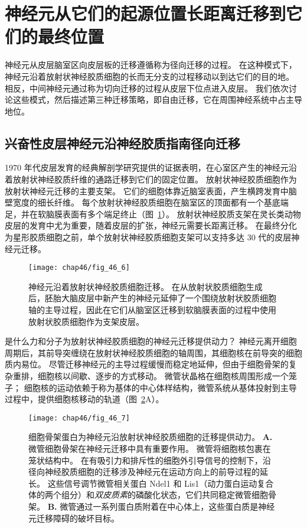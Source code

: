 \section{神经元从它们的起源位置长距离迁移到它们的最终位置}

神经元从皮层脑室区向皮层板的迁移遵循称为径向迁移的过程。
在这种模式下，神经元沿着放射状神经胶质细胞的长而无分支的过程移动以到达它们的目的地。
相反，中间神经元通过称为切向迁移的过程从皮层下位点进入皮层。
我们依次讨论这些模式，然后描述第三种迁移策略，即自由迁移，它在周围神经系统中占主导地位。



\subsection{兴奋性皮层神经元沿神经胶质指南径向迁移}

1970 年代皮层发育的经典解剖学研究提供的证据表明，在心室区产生的神经元沿着放射状神经胶质纤维的通路迁移到它们的固定位置。
放射状神经胶质细胞作为放射状神经元迁移的主要支架。
它们的细胞体靠近脑室表面，产生横跨发育中脑壁宽度的细长纤维。
每个放射状神经胶质细胞在脑室区的顶面都有一个基底端足，并在软脑膜表面有多个端足终止（图~\ref{fig:46_6}）。
放射状神经胶质支架在灵长类动物皮层的发育中尤为重要，随着皮层的扩张，神经元需要长距离迁移。
在最终分化为星形胶质细胞之前，单个放射状神经胶质细胞支架可以支持多达 30 代的皮层神经元迁移。


\begin{figure}[htbp]
	\centering
	\texttt{[image: chap46/fig\_46\_6]}
	\caption{神经元沿着放射状神经胶质细胞迁移。
		在从放射状胶质细胞生成后，胚胎大脑皮层中新产生的神经元延伸了一个围绕放射状胶质细胞轴的主导过程，因此在它们从脑室区迁移到软脑膜表面的过程中使用放射状胶质细胞作为支架皮层。}
	\label{fig:46_6}
\end{figure}


是什么力和分子为放射状神经胶质细胞的神经元迁移提供动力？
神经元离开细胞周期后，其前导突缠绕在放射状神经胶质细胞的轴周围，其细胞核在前导突的细胞质内易位。
尽管迁移神经元的主导过程缓慢而稳定地延伸，但由于细胞骨架的复杂重排，细胞核以间歇、逐步的方式移动。 
微管状晶格在细胞核周围形成一个笼子；
细胞核的运动依赖于称为基体的中心体样结构，微管系统从基体投射到主导过程中，提供细胞核移动的轨道（图~\ref{fig:46_7}A）。


\begin{figure}[htbp]
	\centering
	\texttt{[image: chap46/fig\_46\_7]}
	\caption{细胞骨架蛋白为神经元沿放射状神经胶质细胞的迁移提供动力。
		\textbf{A.} 微管细胞骨架在神经元迁移中具有重要作用。
		微管将细胞核包裹在笼状结构中。
		在有吸引力和排斥性的细胞外引导信号的控制下，沿径向神经胶质细胞的迁移涉及神经元在运动方向上的前导过程的延长。
		这些信号调节微管相关蛋白 Ndel1 和 Lis1（动力蛋白运动复合体的两个组分）和\textit{双皮质素}的磷酸化状态，它们共同稳定微管细胞骨架\cite{gleeson2000neuronal}。
		\textbf{B.} 微管通过一系列蛋白质附着在中心体上，这些蛋白质是神经元迁移障碍的破坏目标。}
	\label{fig:46_7}
\end{figure}


